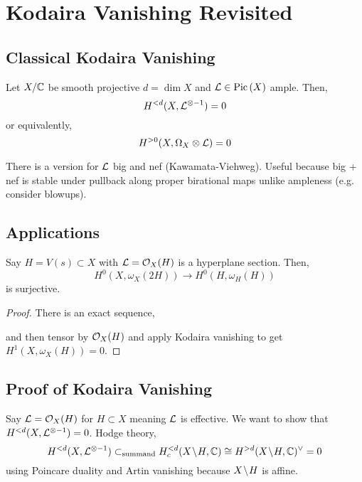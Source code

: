 \documentclass[12pt]{article}
\begin{document}
\section{Kodaira Vanishing Revisited}

\subsection{Classical Kodaira Vanishing}

\begin{theorem}
Let $X / \mathbb{C}$ be smooth projective $d = \dim{X}$ and $\mathcal{L} \in \mathrm{Pic} \left( X \right)$ ample. Then,
\[ H^{< d}(X, \mathcal{L}^{\otimes -1}) = 0 \]
or equivalently,
\[ H^{> 0}(X, \Omega_X \otimes \mathcal{L}) = 0 \] 
\end{theorem}

\begin{rmk}
There is a version for $\mathcal{L}$ big and nef (Kawamata-Viehweg). Useful because big + nef is stable under pullback along proper birational maps unlike ampleness (e.g. consider blowups). 
\end{rmk}

\subsection{Applications}

Say $H = V(s) \subset X$ with $\mathcal{L} = \mathcal{O}_{X}(H)$ is a hyperplane section. Then,
\[ H^0(X, \omega_X(2H)) \to H^0(H, \omega_H(H)) \]
is surjective. 

\begin{proof}
There is an exact sequence,
\begin{center}
\end{center}
and then tensor by $\mathcal{O}_{X}(H)$ and apply Kodaira vanishing to get $H^1(X, \omega_X(H)) = 0$.
\end{proof}

\subsection{Proof of Kodaira Vanishing}

Say $\mathcal{L} = \mathcal{O}_{X}(H)$ for $H \subset X$ meaning $\mathcal{L}$ is effective. We want to show that $H^{<d}(X, \mathcal{L}^{\otimes -1}) = 0$. Hodge theory,
\[ H^{<d}(X, \mathcal{L}^{\otimes -1}) \subset_{\text{summand}} H^{<d}_c(X \! \setminus \! H, \mathbb{C}) \cong H^{>d}(X \! \setminus \! H, \mathbb{C})^\vee = 0 \]
using Poincare duality and Artin vanishing because $X \! \setminus \! H$ is affine.  
\end{document}
